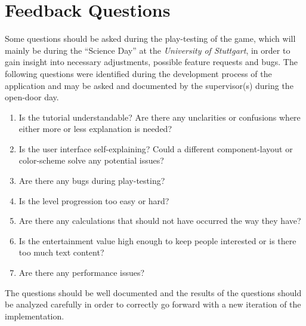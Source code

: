 \section{Feedback Questions}\label{sec:feedback-questions}
Some questions should be asked during the play-testing of the game, which will mainly be during the ``Science Day'' at the \textit{University of Stuttgart},
in order to gain insight into necessary adjustments, possible feature requests and bugs.
The following questions were identified during the development process of the application and
may be asked and documented by the supervisor(s) during the open-door day.
\begin{enumerate}
    \item Is the tutorial understandable? Are there any unclarities or confusions where either more or less explanation is needed?
    \item Is the user interface self-explaining? Could a different component-layout or color-scheme solve any potential issues?
    \item Are there any bugs during play-testing?
    \item Is the level progression too easy or hard?
    \item Are there any calculations that should not have occurred the way they have?
    \item Is the entertainment value high enough to keep people interested or is there too much text content?
    \item Are there any performance issues?
\end{enumerate}
The questions should be well documented and the results of the questions should be analyzed carefully in order to
correctly go forward with a new iteration of the implementation.